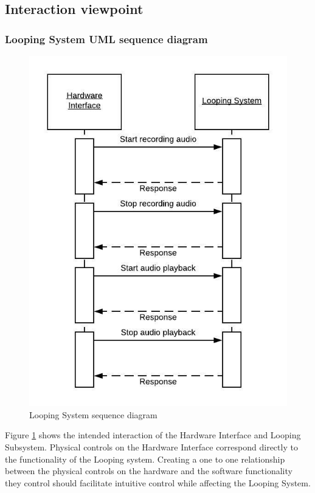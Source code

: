 \subsection{Interaction viewpoint}

    \subsubsection{Looping System UML sequence diagram}
        \begin{figure}[!ht]
            \centering
            \includegraphics[width=.45\textwidth]{diagrams/looping-interaction.jpeg}
            \caption{Looping System sequence diagram}
            \label{fig:looping}
        \end{figure}
       Figure \ref{fig:looping} shows the intended interaction of the Hardware Interface and Looping Subsystem. Physical controls on the Hardware Interface correspond directly to the functionality of the Looping system. Creating a one to one relationship between the physical controls on the hardware and the software functionality they control should facilitate intuitive control while affecting the Looping System.

